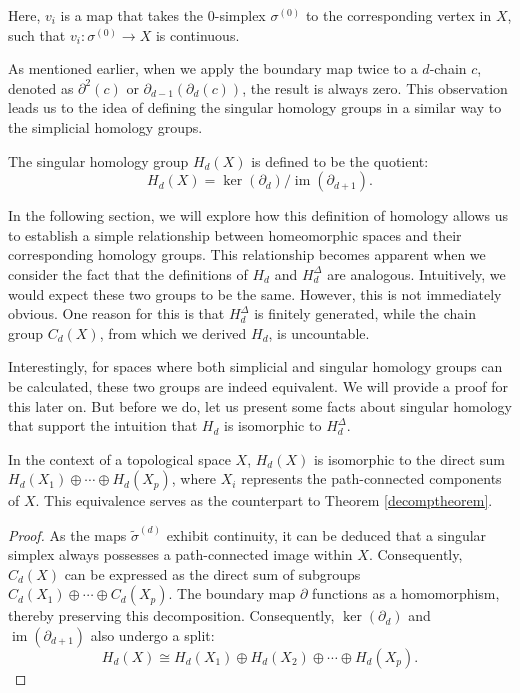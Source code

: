 Here, $v_{i}$ is a map that takes the $0$-simplex $\sigma^{(0)}$ to the
corresponding vertex in $X$, such that $v_{i}: \sigma^{(0)}\to X$ is continuous.

As mentioned earlier, when we apply the boundary map twice to a $d$-chain $c$, denoted
as $\partial^{2}(c)$ or $\partial_{d-1}(\partial_{d}(c))$, the result is always
zero. This observation leads us to the idea of defining the singular homology groups
in a similar way to the simplicial homology groups.

\begin{definition}
	The singular homology group $H_{d}(X)$ is
	defined to be the quotient:
	\[
		H_{d}(X) = \ker(\partial_{d}) / \operatorname{im}(\partial_{d+1}).
	\]
\end{definition}

In the following section, we will explore how this definition of homology allows
us to establish a simple relationship between homeomorphic spaces and their corresponding
homology groups. This relationship becomes apparent when we consider the fact
that the definitions of $H_{d}$ and $H^{\Delta}_{d}$ are analogous. Intuitively,
we would expect these two groups to be the same. However, this is not
immediately obvious. One reason for this is that $H^{\Delta}_{d}$ is finitely generated,
while the chain group $C_{d}(X)$, from which we derived $H_{d}$, is uncountable.

Interestingly, for spaces where both simplicial and singular homology groups can
be calculated, these two groups are indeed equivalent. We will provide a proof for
this later on. But before we do, let us present some facts about singular homology
that support the intuition that $H_{d}$ is isomorphic to $H^{\Delta}_{d}$.

\begin{proposition}
	In the context of a topological space $X$, $H_{d}(X)$ is isomorphic to the
	direct sum $H_{d}(X_{1}) \oplus \cdots \oplus H_{d}(X_{p})$, where $X_{i}$ represents
	the path-connected components of $X$. This equivalence serves as the
	counterpart to Theorem \ref{decomptheorem}.
\end{proposition}

\begin{proof}
	As the maps $\tilde{\sigma}^{(d)}$ exhibit continuity, it can be deduced that
	a singular simplex always possesses a path-connected image within $X$. Consequently,
	$C_{d}(X)$ can be expressed as the direct sum of subgroups
	$C_{d}(X_{1}) \oplus \cdots \oplus C_{d}(X_{p})$. The boundary map $\partial$ functions
	as a homomorphism, thereby preserving this decomposition. Consequently,
	$\ker(\partial_{d})$ and $\operatorname{im}(\partial_{d+1})$ also undergo a
	split:
	\[
		H_{d}(X) \cong H_{d}(X_{1}) \oplus H_{d}(X_{2}) \oplus \cdots \oplus H_{d}(X_{p}
		).
	\]
\end{proof}

